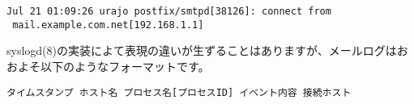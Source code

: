 \begin{verbatim}
Jul 21 01:09:26 urajo postfix/smtpd[38126]: connect from
 mail.example.com.net[192.168.1.1]
\end{verbatim}

syslogd(8)の実装によて表現の違いが生ずることはありますが、メールログはおおよそ以下のようなフォーマットです。

\begin{lstlisting}[basicstyle=\ttfamily\footnotesize, frame=single]
タイムスタンプ ホスト名 プロセス名[プロセスID] イベント内容 接続ホスト
\end{lstlisting}



